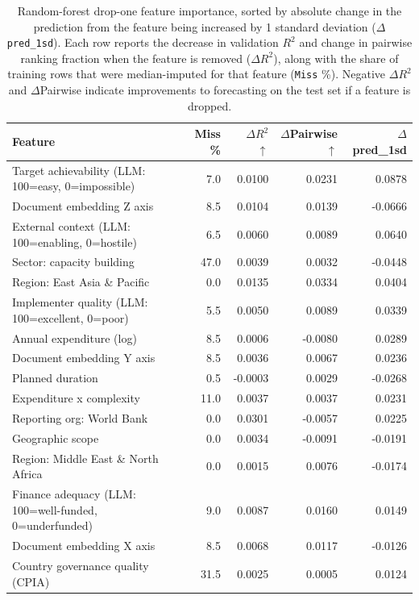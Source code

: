 \documentclass[12pt,a4paper]{article}
\begin{document}
\begin{table}[t]
\centering
\caption{Random-forest drop-one feature importance, sorted by absolute change in the prediction from the feature being increased by 1 standard deviation ($\Delta$ \texttt{pred\_1sd}). Each row reports the decrease in validation $R^2$ and change in pairwise ranking fraction when the feature is removed ($\Delta R^2$\tnote{*}), along with the share of training rows that were median-imputed for that feature (\texttt{Miss} \%). Negative $\Delta R^2$ and $\Delta$Pairwise indicate improvements to forecasting on the test set if a feature is dropped.
}
\begin{tabular}{p{6cm}rrrr}
\toprule
Feature & Miss \% & $\Delta R^2$ $\uparrow$ & $\Delta$Pairwise $\uparrow$ & $\Delta$pred\_1sd \\
\midrule
Target achievability (LLM: 100=easy, 0=impossible) & 7.0 & 0.0100 & 0.0231 & 0.0878 \\[2pt]
Document embedding Z axis & 8.5 & 0.0104 & 0.0139 & -0.0666 \\[2pt]
External context (LLM: 100=enabling, 0=hostile) & 6.5 & 0.0060 & 0.0089 & 0.0640 \\[2pt]
Sector: capacity building & 47.0 & 0.0039 & 0.0032 & -0.0448 \\[2pt]
Region: East Asia \& Pacific & 0.0 & 0.0135 & 0.0334 & 0.0404 \\[2pt]
Implementer quality (LLM: 100=excellent, 0=poor) & 5.5 & 0.0050 & 0.0089 & 0.0339 \\[2pt]
Annual expenditure (log) & 8.5 & 0.0006 & -0.0080 & 0.0289 \\[2pt]
Document embedding Y axis & 8.5 & 0.0036 & 0.0067 & 0.0236 \\[2pt]
Planned duration & 0.5 & -0.0003 & 0.0029 & -0.0268 \\[2pt]
Expenditure x complexity & 11.0 & 0.0037 & 0.0037 & 0.0231 \\[2pt]
Reporting org: World Bank & 0.0 & 0.0301 & -0.0057 & 0.0225 \\[2pt]
Geographic scope & 0.0 & 0.0034 & -0.0091 & -0.0191 \\[2pt]
Region: Middle East \& North Africa & 0.0 & 0.0015 & 0.0076 & -0.0174 \\[2pt]
Finance adequacy (LLM: 100=well-funded, 0=underfunded) & 9.0 & 0.0087 & 0.0160 & 0.0149 \\[2pt]
Document embedding X axis & 8.5 & 0.0068 & 0.0117 & -0.0126 \\[2pt]
Country governance quality (CPIA) & 31.5 & 0.0025 & 0.0005 & 0.0124 \\[2pt]

\end{tabular}
\end{table}
\end{document}
